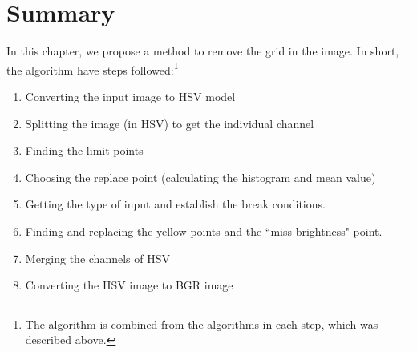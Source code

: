 \section{Summary}
In this chapter, we propose a method to remove the grid in the image. In short, the algorithm have steps followed:\footnote{The algorithm is combined from the algorithms in each step, which was described above.}
\begin{enumerate}
\item Converting the input image to HSV model
\item Splitting the image (in HSV) to get the individual channel
\item Finding the limit points
\item Choosing the replace point (calculating the histogram and mean value)
\item Getting the type of input and establish the break conditions.
\item Finding and replacing the yellow points and the ``miss brightness" point.
\item Merging the channels of HSV
\item Converting the HSV image to BGR image
\end{enumerate}







































